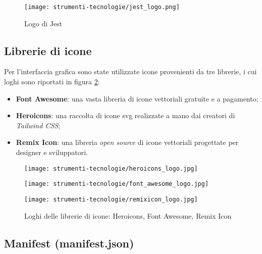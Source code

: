 \begin{figure}[H]
  \centering 
  \texttt{[image: strumenti-tecnologie/jest\_logo.png]}
  \caption{Logo di Jest}
  \label{fig:logo_jest} 
\end{figure}

\subsection*{Librerie di icone}

\par Per l’interfaccia grafica sono state utilizzate icone provenienti da tre librerie, i cui loghi sono riportati in figura \ref{fig:loghi_librerie_icone}:
\begin{itemize}
  \item \textbf{Font Awesome}: una vasta libreria di icone vettoriali gratuite e a pagamento;
  \item \textbf{Heroicons}: una raccolta di icone \gls{svg} realizzate a mano dai creatori di \textit{Tailwind CSS};
  \item \textbf{Remix Icon}: una libreria \textit{open source} di icone vettoriali progettate per designer e sviluppatori.
\end{itemize}

\vspace{5pt}
\begin{figure}[H]
  \centering
  \begin{minipage}{0.3\columnwidth}
    \centering
    \texttt{[image: strumenti-tecnologie/heroicons\_logo.jpg]} 
  \end{minipage}
  \hfill
  \begin{minipage}{0.3\columnwidth}
    \centering
    \texttt{[image: strumenti-tecnologie/font\_awesome\_logo.jpg]} 
  \end{minipage}
  \hfill
  \begin{minipage}{0.3\columnwidth}
    \centering
    \texttt{[image: strumenti-tecnologie/remixicon\_logo.jpg]} 
  \end{minipage}
  \caption{Loghi delle librerie di icone: Heroicons, Font Awesome, Remix Icon}
  \label{fig:loghi_librerie_icone}
\end{figure}
\vspace{5pt}

\subsection*{Manifest (manifest.json)}

